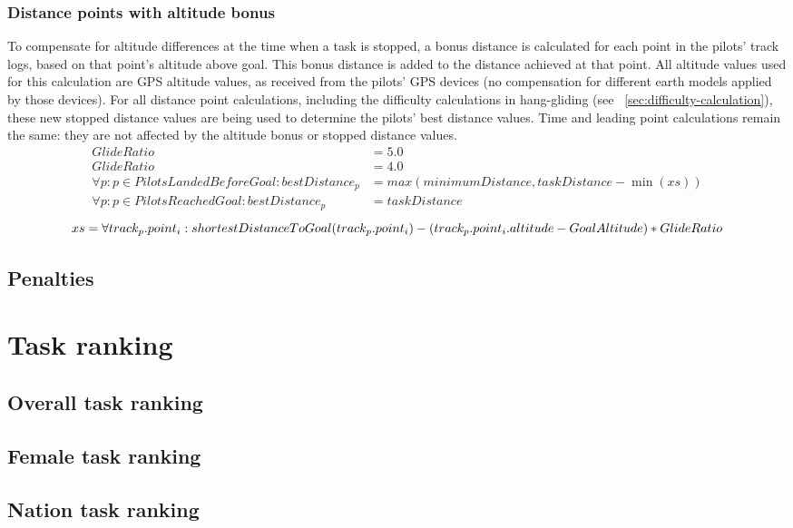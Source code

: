 \documentclass{article}
\begin{document}
\subsubsection{Distance points with altitude bonus}
\label{sec:distance-stopped-tasks}
To compensate for altitude differences at the time when a task is stopped, a bonus distance is
calculated for each point in the pilots’ track logs, based on that point’s altitude above goal. This bonus
distance is added to the distance achieved at that point. All altitude values used for this calculation are
GPS altitude values, as received from the pilots’ GPS devices (no compensation for different earth
models applied by those devices). For all distance point calculations, including the difficulty calculations
in hang-gliding (see ~\ref{sec:difficulty-calculation}), these new stopped distance values are being used to determine the pilots’
best distance values. Time and leading point calculations remain the same: they are not affected by the
altitude bonus or stopped distance values.
\begin{align*}
    GlideRatio &= 5.0 \\
    GlideRatio &= 4.0 \\
    \forall p : p \in PilotsLandedBeforeGoal : bestDistance_p &= max(minimumDistance, taskDistance - \min(xs)) \\
    \forall p : p \in PilotsReachedGoal : bestDistance_p &= taskDistance
\end{align*}
\[ xs = \forall track_p . point_i : shortestDistanceToGoal(track_p . point_i) - (track_p . point_i . altitude - GoalAltitude) * GlideRatio \\ \]

\subsection{Penalties}

\newpage
\section{Task ranking}
\subsection{Overall task ranking}
\subsection{Female task ranking}
\subsection{Nation task ranking}
\end{document}
